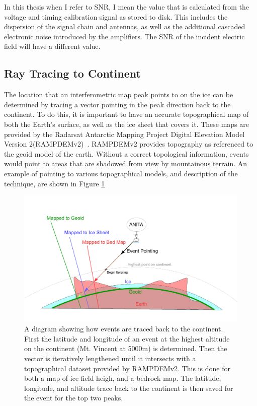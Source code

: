 	In this thesis when I refer to SNR, I mean the value that is calculated from the voltage and timing calibration signal as stored to disk.  This includes the dispersion of the signal chain and antennas, as well as the additional cascaded electronic noise introduced by the amplifiers.  The SNR of the incident electric field will have a different value.
	
	
	\subsection{Ray Tracing to Continent}
		 The location that an interferometric map peak points to on the ice can be determined by tracing a vector pointing in the peak direction back to the continent.  To do this, it is important to have an accurate topographical map of both the Earth's surface, as well as the ice sheet that covers it.  These maps are provided by the Radarsat Antarctic Mapping Project Digital Elevation Model Version 2(RAMPDEMv2)~\cite{RAMPDEM}.  RAMPDEMv2 provides topography as referenced to the geoid model of the earth.  Without a correct topological information, events would point to areas that are shadowed from view by mountainous terrain.  An example of pointing to various topographical models, and description of the technique, are shown in Figure \ref{fig:traceBackToContinent}
		 
\begin{figure}
	\centering
	\includegraphics[height=0.5\textheight]{figures/traceBackToContinent}
	\caption{A diagram showing how events are traced back to the continent.  First the latitude and longitude of an event at the highest altitude on the continent (Mt. Vincent at 5000m) is determined.  Then the vector is iteratively lengthened until it intersects with a topographical dataset provided by RAMPDEMv2.  This is done for both a map of ice field heigh, and a bedrock map.  The latitude, longitude, and altitude trace back to the continent is then saved for the event for the top two peaks.} 
	\label{fig:traceBackToContinent}
\end{figure}	 
		
